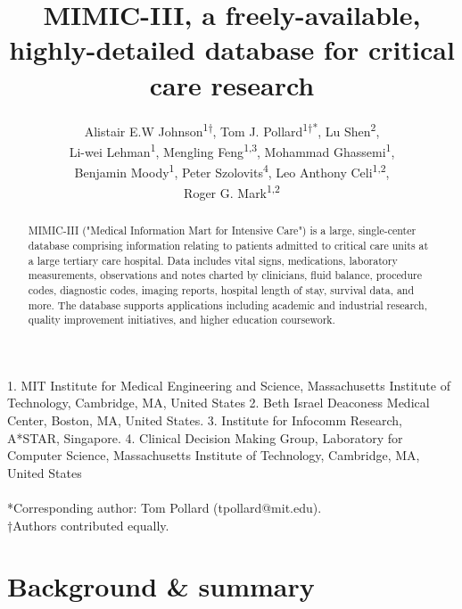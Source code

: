 \documentclass[english]{article}
\begin{document}
\title{MIMIC-III, a freely-available, highly-detailed database for critical care research}


\author{
Alistair E.W Johnson\textsuperscript{1{†}},
Tom J. Pollard\textsuperscript{1{†}{*}},
Lu Shen\textsuperscript{2}, \\
Li-wei Lehman\textsuperscript{1},
Mengling Feng\textsuperscript{1,3},
Mohammad Ghassemi\textsuperscript{1}, \\
Benjamin Moody\textsuperscript{1},
Peter Szolovits\textsuperscript{4},
Leo Anthony Celi\textsuperscript{1,2}, \\
Roger G. Mark\textsuperscript{1,2}
}

\maketitle
\thispagestyle{fancy}

1. MIT Institute for Medical Engineering and Science, Massachusetts Institute of Technology, Cambridge, MA, United States 2. Beth Israel Deaconess Medical Center, Boston, MA, United States. 3. Institute for Infocomm Research, A*STAR, Singapore. 4. Clinical Decision Making Group, Laboratory for Computer Science, Massachusetts Institute of Technology, Cambridge, MA, United States \\ 
\\
{*}Corresponding author: Tom Pollard (tpollard@mit.edu). \\
{†}Authors contributed equally.

\begin{abstract} %
MIMIC-III ("Medical Information Mart for Intensive Care") is a large, single-center database comprising information relating to patients admitted to critical care units at a large tertiary care hospital. Data includes vital signs, medications, laboratory measurements, observations and notes charted by clinicians, fluid balance, procedure codes, diagnostic codes, imaging reports, hospital length of stay, survival data, and more. The database supports applications including academic and industrial research, quality improvement initiatives, and higher education coursework.
\end{abstract}

\section*{Background \& summary} %
\end{document}
